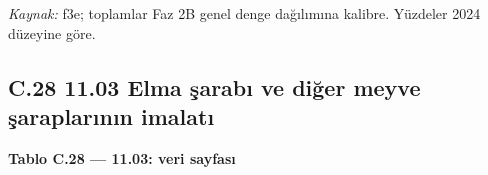 \endgroup

\emph{Kaynak:} \etiketT{} f3e; toplamlar Faz 2B genel denge dağılımına kalibre. Yüzdeler 2024 düzeyine göre.

\hypertarget{nace_kartlar_10-12-c28-1103-elma-ux15farabux131-ve-diux11fer-meyve-ux15faraplarux131nux131n-imalatux131}{%
\subsection{C.28 11.03 Elma şarabı ve diğer meyve şaraplarının imalatı}\label{nace_kartlar_10-12-c28-1103-elma-ux15farabux131-ve-diux11fer-meyve-ux15faraplarux131nux131n-imalatux131}}


\textbf{Tablo C.28 --- 11.03: veri sayfası}

\nopagebreak[4]

\begingroup\gbtablo\small


